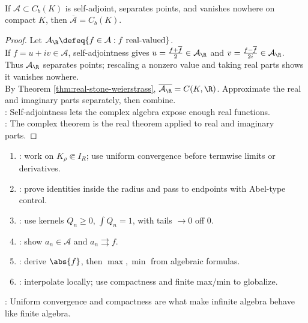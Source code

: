 \begin{theorem} \label{thm:complex-stone-weierstrass} \\
If $\mathcal{A}\subset C_b(K)$ is self-adjoint, separates points, and vanishes nowhere on compact $K$, then $\overline{\mathcal{A}}=C_b(K)$.
\begin{proof}
Let $\mathcal{A}_{\R}\defeq\{f\in\mathcal{A}:f\text{ real-valued}\}$.\\
If $f=u+iv\in\mathcal{A}$, self-adjointness gives $u=\frac{f+\overline{f}}{2}\in\mathcal{A}_{\R}$ and $v=\frac{f-\overline{f}}{2i}\in\mathcal{A}_{\R}$.\\
Thus $\mathcal{A}_{\R}$ separates points; rescaling a nonzero value and taking real parts shows it vanishes nowhere.\\
By Theorem \ref{thm:real-stone-weierstrass}, $\overline{\mathcal{A}_{\R}}=C(K,\R)$. Approximate the real and imaginary parts separately, then combine.\\
: Self-adjointness lets the complex algebra expose enough real functions.\\
: The complex theorem is the real theorem applied to real and imaginary parts.
\end{proof}
\end{theorem}

\begin{method} \label{meth:power-approx-fourier-proof-patterns-source-todo}\label{meth:power-series-approximation-proof-patterns} 
\begin{enumerate}[label=(\roman*)]
\setlength{\itemsep}{0pt}
\item {}: work on $K_\rho\Subset I_R$; use uniform convergence before termwise limits or derivatives.
\item {}: prove identities inside the radius and pass to endpoints with Abel-type control.
\item {}: use kernels $Q_n\geq0$, $\int Q_n=1$, with tails $\to0$ off $0$.
\item {}: show $a_n\in\mathcal{A}$ and $a_n\rightrightarrows f$.
\item {}: derive $\abs{f}$, then $\max,\min$ from algebraic formulas.
\item {}: interpolate locally; use compactness and finite max/min to globalize.
\end{enumerate}
: Uniform convergence and compactness are what make infinite algebra behave like finite algebra.
\end{method}
